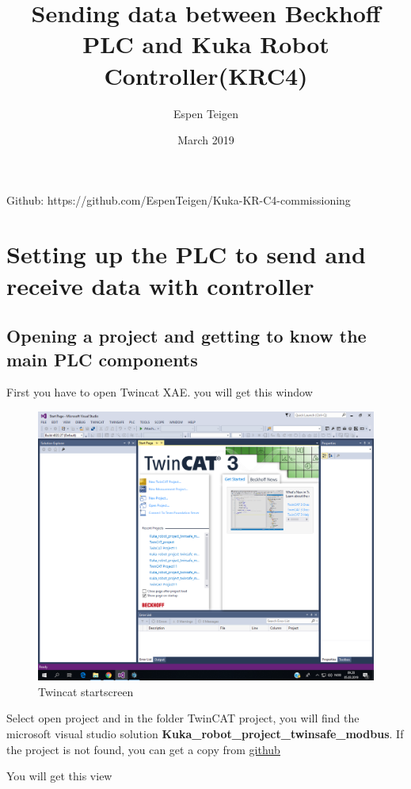 \documentclass{article}
\title{Sending data between Beckhoff PLC and Kuka Robot Controller(KRC4)}
\author{Espen Teigen }
\date{March 2019}
\begin{document}
\maketitle

    Github: https://github.com/EspenTeigen/Kuka-KR-C4-commissioning

\newpage
\section{Setting up the PLC to send and receive data with controller}
\subsection{Opening a project and getting to know the main PLC components}
First you have to open Twincat XAE. you will get this window

\begin{figure}[!h]
    \centering
    \includegraphics[width=\textwidth]{pictures/TC3_overview/TC3_startscreen.png}
    \caption{Twincat startscreen}
    \label{fig:my_label}
\end{figure}

Select open project and in the folder TwinCAT project, you will find the microsoft visual studio solution \textbf{Kuka\_robot\_project\_twinsafe\_modbus}. If the project is not found, you can get a copy from \href{https://github.com/EspenTeigen/Kuka-KR-C4-commissioning}{\underline{github}}

\newpage
You will get this view
\end{document}
